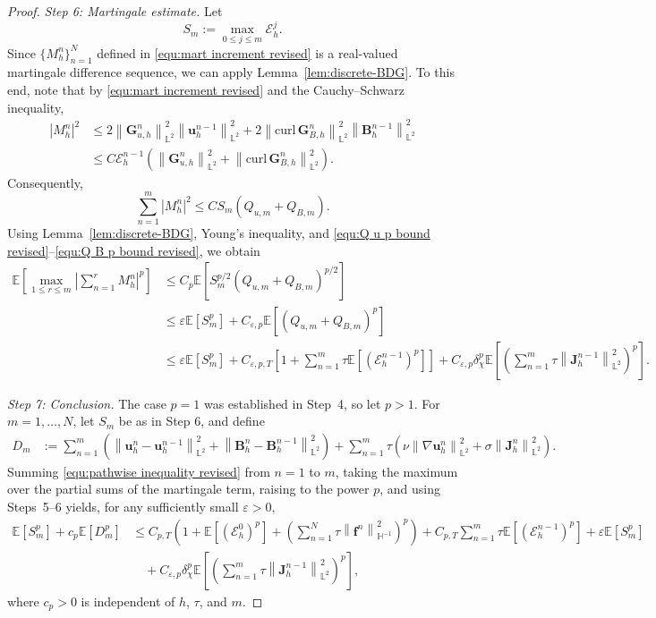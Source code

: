\documentclass[10pt,a4paper]{amsart}
\newcommand{\abs}[1]{\left|{#1}\right|}
\newcommand{\bb}{\mathbb}
\newcommand{\bff}{\boldsymbol}
\newcommand{\curl}{\mathrm{curl}\,}
\newcommand{\norm}[2]{\left\|{#1}\right\|_{#2}}
\begin{document}
\begin{proof}
	
	\emph{Step 6: Martingale estimate.}
	Let
	\[
	S_m:=\max_{0\le j\le m}\mathcal E_h^j.
	\]
	Since $\{M_h^n\}_{n=1}^{N}$ defined in
	\eqref{equ:mart increment revised} is a real-valued martingale difference
	sequence, we can apply Lemma~\ref{lem:discrete-BDG}. To this end, note that by \eqref{equ:mart increment revised} and the Cauchy--Schwarz inequality,
	\begin{align*}
		\abs{M_h^n}^2
		&\le
		2\norm{\bff G_{u,h}^n}{\bb L^2}^2
		\norm{\bff u_h^{n-1}}{\bb L^2}^2
		+
		2\norm{\curl\bff G_{B,h}^n}{\bb L^2}^2
		\norm{\bff B_h^{n-1}}{\bb L^2}^2
		\\
		&\le
		C\mathcal E_h^{n-1}
		\left(
		\norm{\bff G_{u,h}^n}{\bb L^2}^2
		+
		\norm{\curl\bff G_{B,h}^n}{\bb L^2}^2
		\right).
	\end{align*}
	Consequently,
	\[
	\sum_{n=1}^{m}\abs{M_h^n}^2
	\le
	CS_m\left(Q_{u,m}+Q_{B,m}\right).
	\]
	Using Lemma~\ref{lem:discrete-BDG}, Young's inequality, and
	\eqref{equ:Q u p bound revised}--\eqref{equ:Q B p bound revised}, we obtain
	\begin{align*}
		\bb E\left[
		\max_{1\le r\le m}
		\abs{\sum_{n=1}^{r}M_h^n}^{p}
		\right]
		&\le
		C_p\bb E\left[
		S_m^{p/2}
		\left(Q_{u,m}+Q_{B,m}\right)^{p/2}
		\right]
		\nonumber\\
		&\le
		\varepsilon\bb E[S_m^p]
		+
		C_{\varepsilon,p}
		\bb E\left[
		\left(Q_{u,m}+Q_{B,m}\right)^p
		\right]
		\nonumber\\
		&\le
		\varepsilon\bb E[S_m^p]
		+
		C_{\varepsilon,p,T}
		\left[
		1+
		\sum_{n=1}^{m}\tau
		\bb E\left[(\mathcal E_h^{n-1})^p\right]
		\right]
		+
		C_{\varepsilon,p}\delta_\chi^p
		\bb E\left[
		\left(
		\sum_{n=1}^{m}\tau
		\norm{\bff J_h^{n-1}}{\bb L^2}^2
		\right)^p
		\right].
	\end{align*}
	
	
	\emph{Step 7: Conclusion.}
	The case $p=1$ was established in Step~4, so let $p>1$. For
	$m=1,\ldots,N$, let $S_m$ be as in Step 6, and define
	\begin{align*}
		D_m &:=
		\sum_{n=1}^{m}
		\left(
		\norm{\bff u_h^n-\bff u_h^{n-1}}{\bb L^2}^2
		+
		\norm{\bff B_h^n-\bff B_h^{n-1}}{\bb L^2}^2
		\right)
		+
		\sum_{n=1}^{m}\tau
		\left(
		\nu\norm{\nabla\bff u_h^n}{\bb L^2}^2
		+
		\sigma\norm{\bff J_h^n}{\bb L^2}^2
		\right).
	\end{align*}
	Summing \eqref{equ:pathwise inequality revised} from $n=1$ to $m$,
	taking the maximum over the partial sums of the martingale term, raising
	to the power $p$, and using Steps~5--6 yields, for any sufficiently small
	$\varepsilon>0$,
	\begin{align}
		\label{equ:stability conclusion before absorption}
		\bb E[S_m^p]
		+
		c_p\bb E[D_m^p]
		&\le
		C_{p,T}
		\left(
		1
		+
		\bb E[(\mathcal E_h^0)^p]
		+
		\left(
		\sum_{n=1}^{N}
		\tau\norm{\bff f^n}{\bb H^{-1}}^2
		\right)^p
		\right)
		+
		C_{p,T}
		\sum_{n=1}^{m}
		\tau\bb E[(\mathcal E_h^{n-1})^p]
		+
		\varepsilon\bb E[S_m^p]
		\nonumber\\
		&\quad
		+
		C_{\varepsilon,p}\delta_\chi^p
		\bb E\left[
		\left(
		\sum_{n=1}^{m}
		\tau\norm{\bff J_h^{n-1}}{\bb L^2}^2
		\right)^p
		\right],
	\end{align}
	where $c_p>0$ is independent of $h$, $\tau$, and $m$.
	

\end{proof}
\end{document}
